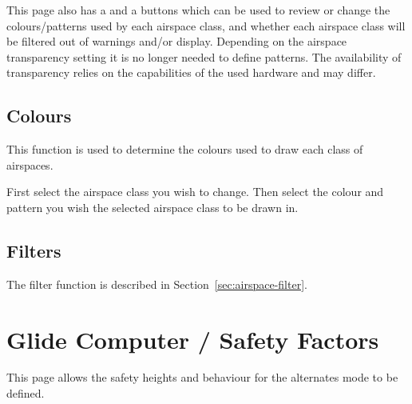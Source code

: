 This page also has a  and a  buttons which
can be used to review or change the colours/patterns used by each
airspace class, and whether each airspace class will be filtered out
of warnings and/or display. Depending on the airspace transparency setting it is 
no longer needed to define patterns. The availability of transparency relies 
on the capabilities of the used hardware and may differ. 

\subsection*{Colours}
This function is used to determine the colours used to draw each class of
airspaces.

First select the airspace class you wish to change. Then select the colour and 
pattern you wish the selected airspace class to be drawn in.

\subsection*{Filters}
The filter function is described in Section~\ref{sec:airspace-filter}.


\section{Glide Computer / Safety Factors}

This page allows the safety heights and behaviour for the alternates mode to be defined.

